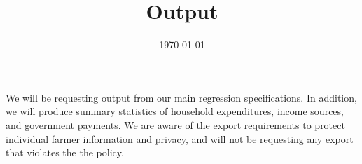 \documentclass[11pt]{article}
\date{\today}
\title{Output}
\begin{document}
\maketitle
We will be requesting output from our main regression specifications. In addition, we will produce summary statistics of household expenditures, income sources, and government payments. We are aware of the export requirements to protect individual farmer information and privacy, and will not be requesting any export that violates the the policy.
\end{document}
